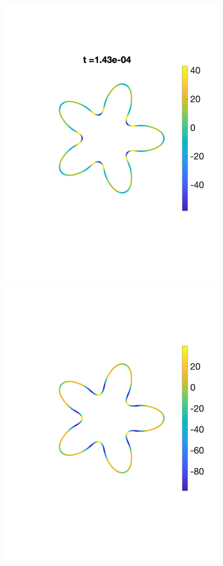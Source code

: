 \documentclass[9pt,twocolumn,twoside,lineno]{pnas-new}
\begin{document}
\begin{figure}[htp]
  \centering
  \includegraphics[width=0.48\linewidth,trim =2cm 5cm 0cm 5cm, clip=true]{figures/StarTensionTime1.pdf}
  \includegraphics[width=0.48\linewidth,trim =2cm 5cm 0cm 5cm, clip=true]{figures/StarFluxTime1.pdf}


\end{figure}
\end{document}

